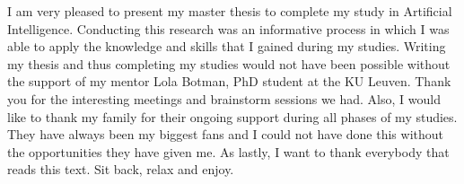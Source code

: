 \documentclass[master=mai,masteroption=eg,english]{kulemt}
\begin{document}
\begin{preface}
	I am very pleased to present my master thesis to complete my study in Artificial Intelligence. Conducting this research was an informative process in which I was able to apply the knowledge and skills that I gained during my studies. Writing my thesis and thus completing my studies would not have been possible
	without the support of my mentor Lola Botman, PhD student at the KU Leuven. Thank you for the interesting meetings and brainstorm sessions we had. Also, I would like to thank my family for their ongoing support during all phases of my studies. They have always been my biggest fans and I could not have done this without the opportunities they have given me. As lastly, I want to thank everybody that reads this text. Sit back, relax and enjoy.
\end{preface}

\tableofcontents*
\end{document}
